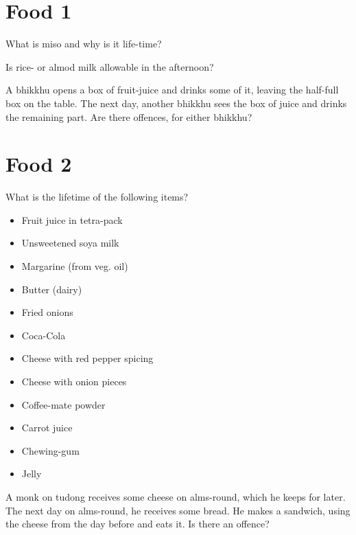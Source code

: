 \section{Food 1}

What is miso and why is it life-time?

Is rice- or almod milk allowable in the afternoon?

A bhikkhu opens a box of fruit-juice and drinks some of it, leaving the
half-full box on the table. The next day, another bhikkhu sees the box
of juice and drinks the remaining part. Are there offences, for either
bhikkhu?

\section{Food 2}

What is the lifetime of the following items?

\begin{itemize}
\tightlist
\item
  Fruit juice in tetra-pack
\item
  Unsweetened soya milk
\item
  Margarine (from veg. oil)
\item
  Butter (dairy)
\item
  Fried onions
\item
  Coca-Cola
\item
  Cheese with red pepper spicing
\item
  Cheese with onion pieces
\item
  Coffee-mate powder
\item
  Carrot juice
\item
  Chewing-gum
\item
  Jelly
\end{itemize}

A monk on tudong receives some cheese on alms-round, which he keeps for
later. The next day on alms-round, he receives some bread. He makes a
sandwich, using the cheese from the day before and eats it. Is there an
offence?

